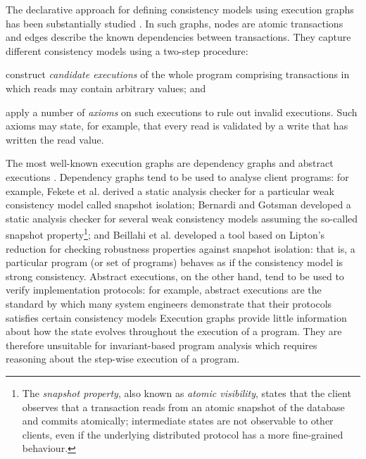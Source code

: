 The declarative approach for defining 
consistency models using execution graphs has been substantially
studied \cite{adya,ev_transactions,framework-concur,SIanalysis,laws}. 
In such graphs,  nodes are atomic transactions and edges describe the
known dependencies between transactions.
They capture different consistency models using  a two-step procedure:
\begin{enumerate*}
\item construct {\em candidate executions} of the whole program comprising
transactions in which reads may contain arbitrary values; and 
\item apply a number of \emph{axioms} on such executions to rule out invalid executions. 
Such axioms may state, for example, that every read is
validated by a write that has written the read value. 
\end{enumerate*}
The most well-known execution graphs are dependency graphs \cite{adya} and abstract
executions \cite{ev_transactions,framework-concur}. 
Dependency graphs tend to be used to analyse  client programs: for
example, 
Fekete et al. \citet{fekete-tods} derived 
a static analysis checker for a particular weak consistency model called
snapshot isolation;  Bernardi and Gotsman \citet{giovanni_concur16}
developed a static analysis checker for several weak consistency
models assuming the so-called snapshot property\footnote{The \emph{snapshot property}, 
also known as \emph{atomic visibility}, states that
the client observes that a transaction reads from an atomic snapshot
of the database and commits atomically;  intermediate states are not observable to other clients, 
even if the underlying
distributed protocol has a more fine-grained behaviour.}; and 
Beillahi et al. \citet{snapshot-isolation-robust-tool} developed a tool based on Lipton's reduction \cite{Lipton-reduction}
for checking robustness properties against snapshot isolation: 
that is, a  particular program (or set of programs) behaves as if the consistency model is strong consistency. 
Abstract executions, on the other hand, tend to be used to verify  implementation protocols: for example,
abstract executions are the  standard by which many system engineers
demonstrate that their protocols satisfies  certain
consistency models \cite{cops,NMSI,PSI}
Execution graphs provide little information about how the 
state evolves throughout the execution of a program.
They are therefore unsuitable for invariant-based program analysis 
which requires reasoning about the step-wise execution of a program. 

